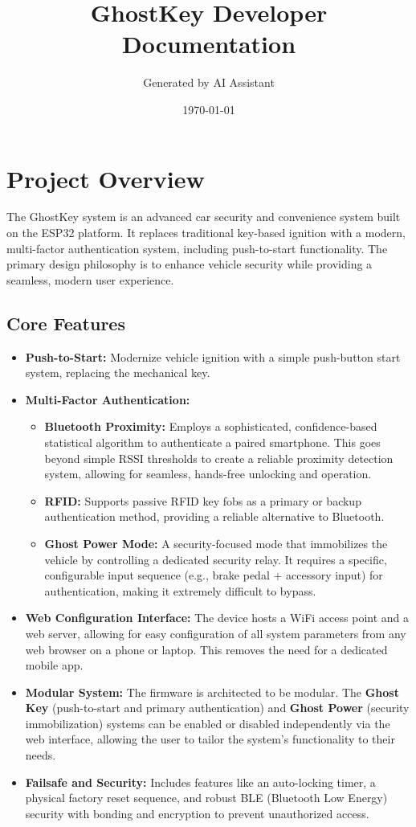 \documentclass{article}
\title{GhostKey Developer Documentation}
\author{Generated by AI Assistant}
\date{\today}
\begin{document}
\maketitle

\section{Project Overview}

The GhostKey system is an advanced car security and convenience system built on the ESP32 platform. It replaces traditional key-based ignition with a modern, multi-factor authentication system, including push-to-start functionality. The primary design philosophy is to enhance vehicle security while providing a seamless, modern user experience.

\subsection{Core Features}
\begin{itemize}
    \item \textbf{Push-to-Start:} Modernize vehicle ignition with a simple push-button start system, replacing the mechanical key.
    \item \textbf{Multi-Factor Authentication:}
    \begin{itemize}
        \item \textbf{Bluetooth Proximity:} Employs a sophisticated, confidence-based statistical algorithm to authenticate a paired smartphone. This goes beyond simple RSSI thresholds to create a reliable proximity detection system, allowing for seamless, hands-free unlocking and operation.
        \item \textbf{RFID:} Supports passive RFID key fobs as a primary or backup authentication method, providing a reliable alternative to Bluetooth.
        \item \textbf{Ghost Power Mode:} A security-focused mode that immobilizes the vehicle by controlling a dedicated security relay. It requires a specific, configurable input sequence (e.g., brake pedal + accessory input) for authentication, making it extremely difficult to bypass.
    \end{itemize}
    \item \textbf{Web Configuration Interface:} The device hosts a WiFi access point and a web server, allowing for easy configuration of all system parameters from any web browser on a phone or laptop. This removes the need for a dedicated mobile app.
    \item \textbf{Modular System:} The firmware is architected to be modular. The \textbf{Ghost Key} (push-to-start and primary authentication) and \textbf{Ghost Power} (security immobilization) systems can be enabled or disabled independently via the web interface, allowing the user to tailor the system's functionality to their needs.
    \item \textbf{Failsafe and Security:} Includes features like an auto-locking timer, a physical factory reset sequence, and robust BLE (Bluetooth Low Energy) security with bonding and encryption to prevent unauthorized access.
\end{itemize}
\end{document}
